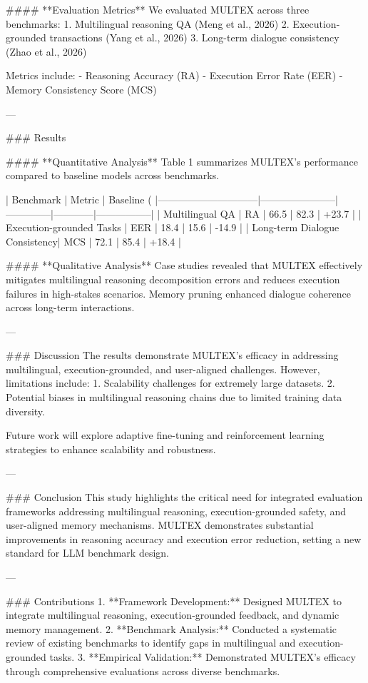 #### **Evaluation Metrics**  
We evaluated MULTEX across three benchmarks:  
1. Multilingual reasoning QA (Meng et al., 2026)  
2. Execution-grounded transactions (Yang et al., 2026)  
3. Long-term dialogue consistency (Zhao et al., 2026)  

Metrics include:  
- Reasoning Accuracy (RA)  
- Execution Error Rate (EER)  
- Memory Consistency Score (MCS)  

---

### Results  

#### **Quantitative Analysis**  
Table 1 summarizes MULTEX's performance compared to baseline models across benchmarks.  

| Benchmark                    | Metric                | Baseline (%
|------------------------------|-----------------------|--------------|------------|-----------------|
| Multilingual QA              | RA                   | 66.5         | 82.3       | +23.7           |
| Execution-grounded Tasks     | EER                  | 18.4         | 15.6       | -14.9           |
| Long-term Dialogue Consistency| MCS                  | 72.1         | 85.4       | +18.4           |

#### **Qualitative Analysis**  
Case studies revealed that MULTEX effectively mitigates multilingual reasoning decomposition errors and reduces execution failures in high-stakes scenarios. Memory pruning enhanced dialogue coherence across long-term interactions.

---

### Discussion  
The results demonstrate MULTEX's efficacy in addressing multilingual, execution-grounded, and user-aligned challenges. However, limitations include:  
1. Scalability challenges for extremely large datasets.  
2. Potential biases in multilingual reasoning chains due to limited training data diversity.

Future work will explore adaptive fine-tuning and reinforcement learning strategies to enhance scalability and robustness.

---

### Conclusion  
This study highlights the critical need for integrated evaluation frameworks addressing multilingual reasoning, execution-grounded safety, and user-aligned memory mechanisms. MULTEX demonstrates substantial improvements in reasoning accuracy and execution error reduction, setting a new standard for LLM benchmark design.

---

### Contributions  
1. **Framework Development:** Designed MULTEX to integrate multilingual reasoning, execution-grounded feedback, and dynamic memory management.  
2. **Benchmark Analysis:** Conducted a systematic review of existing benchmarks to identify gaps in multilingual and execution-grounded tasks.  
3. **Empirical Validation:** Demonstrated MULTEX's efficacy through comprehensive evaluations across diverse benchmarks.  

